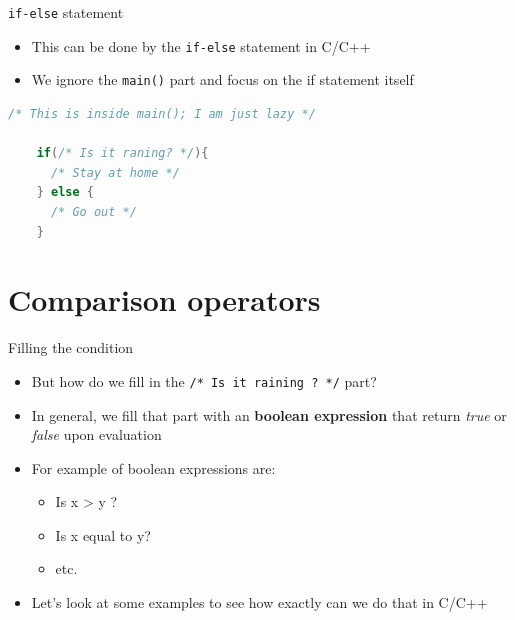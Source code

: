 \documentclass[10pt,xcolor={table,dvipsnames},t]{beamer}
\begin{document}
\begin{frame}[fragile]{\texttt{if-else} statement}
  \begin{itemize}
    \item This can be done by the \texttt{if-else} statement in C/C++
    \item We ignore the \texttt{main()} part and focus on the if statement itself
  \end{itemize}
  \begin{lstlisting}[language=C]
    /* This is inside main(); I am just lazy */

    if(/* Is it raning? */){ 
      /* Stay at home */
    } else {
      /* Go out */
    }
  \end{lstlisting}
\end{frame}

\section{Comparison operators}
\begin{frame}{Filling the condition}
  \begin{itemize}
    \item But how do we fill in the \texttt{/* Is it raining ? */} part?
    \item In general, we fill that part with an \textbf{boolean expression} that return \textit{true} or \textit{false} upon evaluation
    \item For example of boolean expressions are:
    \begin{itemize}
      \item Is x > y ?
      \item Is x equal to y?
      \item etc.
    \end{itemize}
    \item Let's look at some examples to see how exactly can we do that in C/C++
  \end{itemize}
\end{frame}
\end{document}
